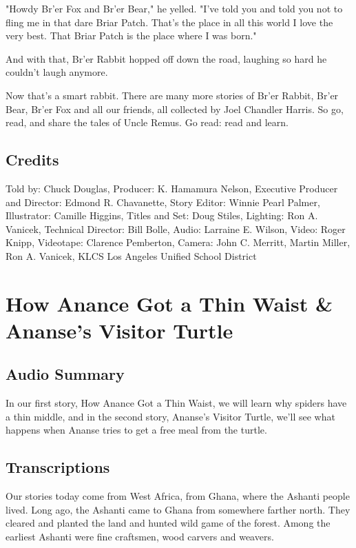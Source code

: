 "Howdy Br'er Fox and Br'er Bear," he yelled. "I've told you and told you not to fling me in that dare Briar Patch. That's the place in all this world I love the very best. That Briar Patch is the place where I was born."

And with that, Br'er Rabbit hopped off down the road, laughing so hard he couldn't laugh anymore.

Now that's a smart rabbit. There are many more stories of Br'er Rabbit, Br'er Bear, Br'er Fox and all our friends, all collected by Joel Chandler Harris. So go, read, and share the tales of Uncle Remus. Go read: read and learn.

\subsection{Credits}

Told by: Chuck Douglas,
Producer: K. Hamamura Nelson,
Executive Producer and Director: Edmond R. Chavanette,
Story Editor: Winnie Pearl Palmer,
Illustrator: Camille Higgins,
Titles and Set: Doug Stiles,
Lighting: Ron A. Vanicek,
Technical Director: Bill Bolle,
Audio: Larraine E. Wilson,
Video: Roger Knipp,
Videotape: Clarence Pemberton,
Camera: John C. Merritt, Martin Miller, Ron A. Vanicek,
KLCS Los Angeles Unified School District

\section{How Anance Got a Thin Waist \& Ananse's Visitor Turtle}

\subsection{Audio Summary}

In our first story, How Anance Got a Thin Waist, we will learn why spiders have a thin middle, and in the second story, Ananse's Visitor Turtle, we'll see what happens when Ananse tries to get a free meal from the turtle.

\subsection{Transcriptions}

Our stories today come from West Africa, from Ghana, where the Ashanti people lived. Long ago, the Ashanti came to Ghana from somewhere farther north. They cleared and planted the land and hunted wild game of the forest. Among the earliest Ashanti were fine craftsmen, wood carvers and weavers.

